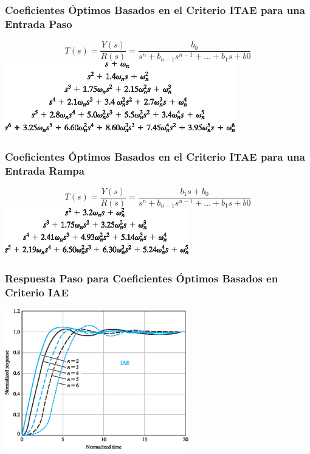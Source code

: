 \documentclass[aspectratio=169]{beamer}
\theoremstyle{definition}
\theoremstyle{plain}
\theoremstyle{remark}
\begin{document}
\begin{frame}[<+->]\frametitle{Coeficientes Óptimos Basados en el Criterio ITAE para una Entrada Paso}
\centering
\begin{equation*}
	T(s) = \frac{Y(s)}{R(s)} = \frac{b_0}{s^n + b_{n-1} s^{n-1} + \dots + b_1 s + b0}
\end{equation*}
\vspace*{10mm}
\includegraphics[width=10cm]{images/optimCoeffsITAEstep.eps}
\end{frame}

\begin{frame}[<+->]\frametitle{Coeficientes Óptimos Basados en el Criterio ITAE para una Entrada Rampa}
\centering
\begin{equation*}
	T(s) = \frac{Y(s)}{R(s)} = \frac{b_1s + b_0}{s^n + b_{n-1} s^{n-1} + \dots + b_1 s + b0}
\end{equation*}
\vspace*{10mm}
\includegraphics[width=8cm]{images/optimCoeffsITAEramp.eps} 
\end{frame}

\begin{frame}[c]\frametitle{Respuesta Paso para Coeficientes Óptimos Basados en Criterio IAE}
\vspace*{5mm}
\centering
\includegraphics[width=8cm]{images/stepResponseOptimIAE.eps}
\end{frame}
\end{document}
